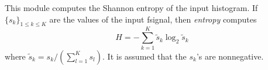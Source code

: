 This module computes the Shannon entropy of the input histogram. 
If $\{s_k\}_{1\leq k\leq K}$ are the values of the input fsignal, 
then {\em entropy} computes
$$H = - \sum_{k=1}^K \tilde{s}_k \log_2 \tilde{s}_k$$
where $\tilde{s}_k = s_k / (\sum_{l=1}^K s_l)$.
It is assumed that the $s_k$'s are nonnegative.
